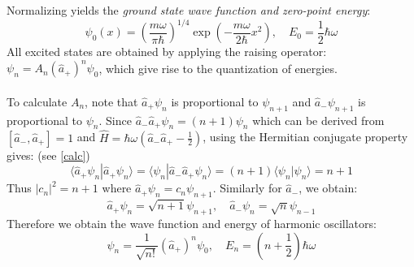 Normalizing yields the \emph{ground state wave function and zero-point energy}:
\[
\psi_0(x) = \left(\frac{m\omega}{\pi\hbar}\right)^{1/4}\exp\left(-\frac{m\omega}{2\hbar}x^2\right), \quad E_0 = \frac{1}{2}\hbar\omega
\]
All excited states are obtained by applying the raising operator: $\psi_n = A_n(\hat{a}_+)^n\psi_0$, which give rise to the quantization of energies.\\ \\
To calculate $A_n$, note that $\hat{a}_+\psi_n$ is proportional to $\psi_{n+1}$ and $\hat{a}_-\psi_{n+1}$ is proportional to $\psi_n$. Since $\hat{a}_-\hat{a}_+\psi_n = (n+1)\psi_n$ which can be derived from $[\hat{a}_-, \hat{a}_+] = 1$ and $\hat{H} = \hbar\omega(\hat{a}_-\hat{a}_+ - \frac{1}{2})$, using the Hermitian conjugate property gives: (see \ref{calc})
\[
\langle\hat{a}_+\psi_n|\hat{a}_+\psi_n\rangle = \langle\psi_n|\hat{a}_-\hat{a}_+\psi_n\rangle = (n+1)\langle\psi_n|\psi_n\rangle = n+1
\]
Thus $|c_n|^2 = n+1$ where $\hat{a}_+\psi_n = c_n\psi_{n+1}$. Similarly for $\hat{a}_-$, we obtain:
\[
\hat{a}_+\psi_n = \sqrt{n+1}\psi_{n+1}, \quad \hat{a}_-\psi_n = \sqrt{n}\psi_{n-1}
\]
Therefore we obtain the wave function and energy of harmonic oscillators:
\[
\psi_n = \frac{1}{\sqrt{n!}}(\hat{a}_+)^n\psi_0, \quad E_n = \left(n + \frac{1}{2}\right)\hbar\omega
\]